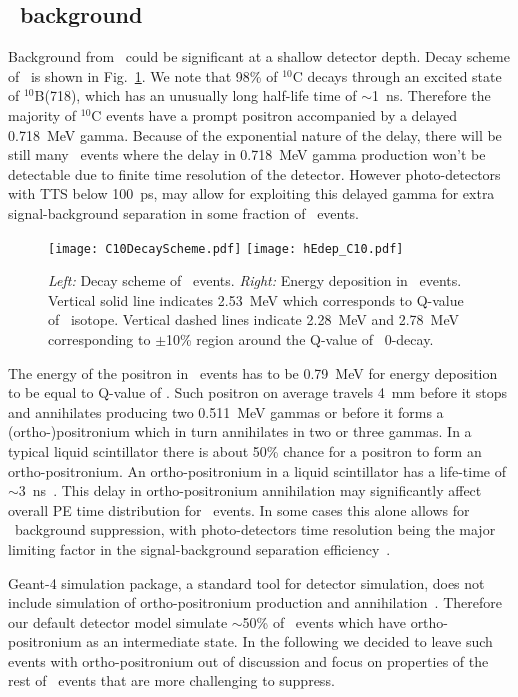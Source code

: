 \subsection{\C~background}

Background from \C~could be significant at a shallow detector depth.
Decay scheme of \C~is shown in Fig.~\ref{fig:C10_scheme_and_edep}. We note that 98\% of $^{10}$C decays through an excited state of $^{10}$B(718),
which has an unusually long half-life time of $\sim$1~ns. Therefore the majority of $^{10}$C events have a prompt positron accompanied by 
a delayed 0.718~MeV gamma. Because of the exponential nature of the delay, there will be still many \C~events where the delay in 
0.718~MeV gamma production won't be detectable due to finite time resolution of the detector. However photo-detectors with TTS below 100~ps, 
may allow for exploiting this delayed gamma for extra signal-background separation in some fraction of \C~events.

\begin{figure}[ht]
  \centering
  \texttt{[image: C10DecayScheme.pdf]}
  \texttt{[image: hEdep\_C10.pdf]}
  \caption{\emph{Left:} Decay scheme of \C~events. \emph{Right:} Energy deposition in \C~events. Vertical solid line indicates 2.53~MeV
    which corresponds to Q-value of \Te~isotope. Vertical dashed lines indicate 2.28~MeV and 2.78~MeV corresponding to $\pm$10\% region 
    around the Q-value of \Te~0\nbb-decay.}
\label{fig:C10_scheme_and_edep}
\end{figure}

The energy of the positron in \C~events has to be 0.79~MeV for energy deposition to be equal to Q-value of \Te. Such positron on average 
travels 4~mm before it stops and annihilates producing two 0.511~MeV gammas or before it forms a (ortho-)positronium which in turn annihilates 
in two or three gammas. In a typical liquid scintillator there is about 50\% chance for a positron to form an ortho-positronium. 
An ortho-positronium in a liquid scintillator has a life-time of $\sim$3~ns~\cite{Ortho-positronium}. This delay in ortho-positronium annihilation
may significantly affect overall PE time distribution for \C~events. In some cases this alone allows for \C~background suppression, 
with photo-detectors time resolution being the major limiting factor in the signal-background separation efficiency~\cite{KLZ-use-of-PSD}.

Geant-4 simulation package, a standard tool for detector simulation, does not include simulation of ortho-positronium production and
annihilation~\cite{Geant4-release-and-private-communication}. Therefore our default detector model simulate $\sim$50\% of \C~events which
have ortho-positronium as an intermediate state. In the following we decided to leave such events with ortho-positronium out of discussion 
and focus on properties of the rest of \C~events that are more challenging to suppress.

